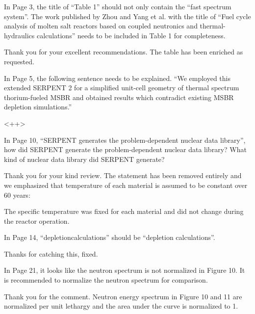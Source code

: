 \documentclass[answers,11pt]{exam}
\begin{document}
\begin{questions}
        \question  In Page 3, the title of ``Table 1'' should not only contain 
        the ``fast spectrum system''. The work published by Zhou and Yang et al. 
        with the title of ``Fuel cycle analysis of molten salt reactors based on 
        coupled neutronics and thermal-hydraulics calculations'' needs to be 
        included in Table 1 for completeness.
        \begin{solution}
                Thank you for your excellent recommendations. The table has been 
                enriched as requested.
        \end{solution}

        \question  In Page 5, the following sentence needs to be explained. ``We 
        employed this extended SERPENT 2 for a simplified unit-cell geometry of 
        thermal spectrum thorium-fueled MSBR and obtained results which 
        contradict existing MSBR depletion simulations.''
        \begin{solution}
                <++>
        \end{solution}

        \question  In Page 10, ``SERPENT generates the problem-dependent nuclear 
        data library'', how did SERPENT generate the problem-dependent nuclear 
        data library? What kind of nuclear data library did SERPENT generate?
        \begin{solution}
                Thank you for your kind review. The statement has been removed
		        entirely and we emphasized that temperature of each material is 
		        assumed to be constant over 60 years:
		        
		        The specific temperature was fixed for each material and did 
		        not change during the reactor operation. 
        \end{solution}

        \question  In Page 14, ``depletioncalculations'' should be ``depletion 
        calculations''.
        \begin{solution}
                Thanks for catching this, fixed.
        \end{solution}

        \question  In Page 21, it looks like the neutron spectrum is not 
        normalized in Figure 10. It is recommended to normalize the neutron 
        spectrum for comparison.
        \begin{solution}
                Thank you for the comment. Neutron energy spectrum in Figure 
                10 and 11 are normalized per unit lethargy and the area under 
                the curve is normalized to 1.
        \end{solution}


\end{questions}
\end{document}
